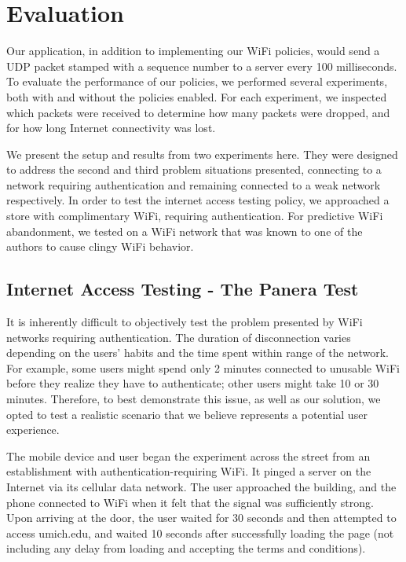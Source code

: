 \section{Evaluation}
\label{sec:eval}

Our application, in addition to implementing our WiFi policies, would send a UDP packet stamped with a sequence number to a server every 100 milliseconds. To evaluate the performance of our policies, we performed several experiments, both with and without the policies enabled. For each experiment, we inspected which packets were received to determine how many packets were dropped, and for how long Internet connectivity was lost.

We present the setup and results from two experiments here. They were designed to address the second and third problem situations presented, connecting to a network requiring authentication and remaining connected to a weak network respectively. In order to test the internet access testing policy, we approached a store with complimentary WiFi, requiring authentication. For predictive WiFi abandonment, we tested on a WiFi network that was known to one of the authors to cause clingy WiFi behavior.

\subsection{Internet Access Testing - The Panera Test}
It is inherently difficult to objectively test the problem presented by WiFi networks requiring authentication. The duration of disconnection varies depending on the users' habits and the time spent within range of the network. For example, some users might spend only 2 minutes connected to unusable WiFi before they realize they have to authenticate; other users might take 10 or 30 minutes. Therefore, to best demonstrate this issue, as well as our solution, we opted to test a realistic scenario that we believe represents a potential user experience.

The mobile device and user began the experiment across the street from an establishment with authentication-requiring WiFi. It pinged a server on the Internet via its cellular data network. The user approached the building, and the phone connected to WiFi when it felt that the signal was sufficiently strong. Upon arriving at the door, the user waited for 30 seconds and then attempted to access umich.edu, and waited 10 seconds after successfully loading the page (not including any delay from loading and accepting the terms and conditions).

